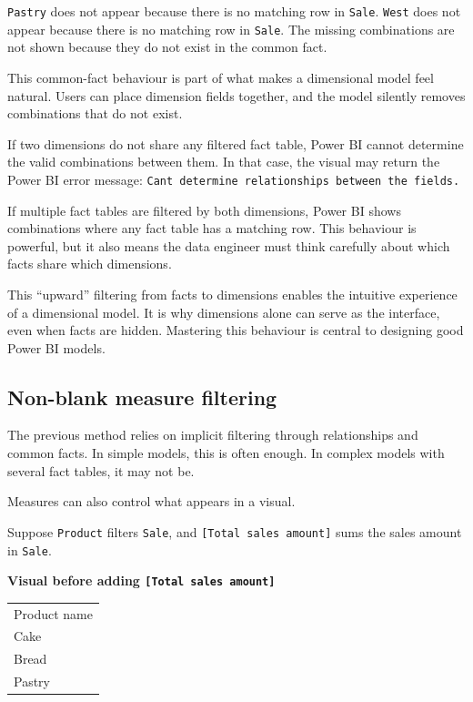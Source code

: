 \documentclass[10pt,openany,10pt]{book}
\newcounter{none}
\let\podeToprule\toprule
\let\podeMidrule\midrule
\let\podeBottomrule\bottomrule
\renewcommand{\toprule}{\arrayrulecolor{pbiGrid}\podeToprule}
\renewcommand{\midrule}{\arrayrulecolor{pbiGrid}\podeMidrule}
\renewcommand{\bottomrule}{\arrayrulecolor{pbiGrid}\podeBottomrule}
\begin{document}
\texttt{Pastry} does not appear because there is no matching row in
\texttt{\textquotesingle{}Sale\textquotesingle{}}. \texttt{West} does
not appear because there is no matching row in
\texttt{\textquotesingle{}Sale\textquotesingle{}}. The missing
combinations are not shown because they do not exist in the common fact.

This common-fact behaviour is part of what makes a dimensional model
feel natural. Users can place dimension fields together, and the model
silently removes combinations that do not exist.

If two dimensions do not share any filtered fact table, Power BI cannot
determine the valid combinations between them. In that case, the visual
may return the Power BI error message:
\texttt{Can\textquotesingle{}t\ determine\ relationships\ between\ the\ fields.}

If multiple fact tables are filtered by both dimensions, Power BI shows
combinations where any fact table has a matching row. This behaviour is
powerful, but it also means the data engineer must think carefully about
which facts share which dimensions.

This ``upward'' filtering from facts to dimensions enables the intuitive
experience of a dimensional model. It is why dimensions alone can serve
as the interface, even when facts are hidden. Mastering this behaviour
is central to designing good Power BI models.

\subsection{Non-blank measure
filtering}\label{non-blank-measure-filtering}

The previous method relies on implicit filtering through relationships
and common facts. In simple models, this is often enough. In complex
models with several fact tables, it may not be.

Measures can also control what appears in a visual.

Suppose \texttt{\textquotesingle{}Product\textquotesingle{}} filters
\texttt{\textquotesingle{}Sale\textquotesingle{}}, and
\texttt{{[}Total\ sales\ amount{]}} sums the sales amount in
\texttt{\textquotesingle{}Sale\textquotesingle{}}.

\textbf{Visual before adding \texttt{{[}Total\ sales\ amount{]}}}

{\def\LTcaptype{none} %
\begin{longtable}[]{@{}l@{}}
\toprule\noalign{}
Product name \\
\midrule\noalign{}
\endhead
\bottomrule\noalign{}
\endlastfoot
Cake \\
Bread \\
Pastry \\
\end{longtable}
}
\end{document}
